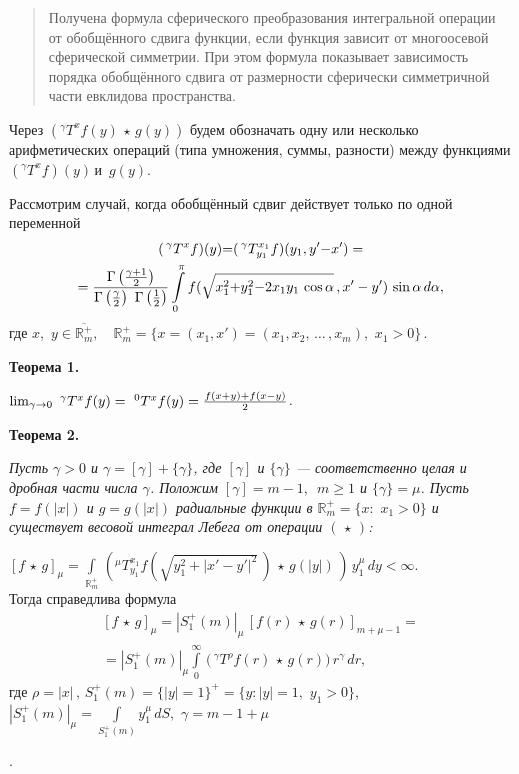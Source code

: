 





\vzmscaption


\begin{quote}
 {\small
Получена формула сферического преобразования интегральной операции от обобщённого сдвига функции, если функция зависит от многоосевой сферической симметрии. При этом формула показывает зависимость порядка обобщённого сдвига от размерности сферически симметричной части евклидова пространства.}
 \end{quote}

	Через
	$
	\left(^\gamma T^xf(y)\,\star\,g(y)\right)
	$
	будем обозначать одну или несколько арифметических операций (типа умножения, суммы, разности) между функциями $\left(^\gamma T^xf\right)(y)$\,и \,$g(y)$.

	 Рассмотрим случай, когда обобщённый сдвиг действует только по одной переменной
\begin{multline*}
	(\,^\gamma T^{x}f)(y){=}(\,^\gamma T_{y_1}^{x_1}f)(y_1,y'{-}x')=
	\\=
	\frac{\Gamma\left(\gamma+1\over2\right)}{\Gamma\left(\frac{\gamma}{2}\right)\,\,\Gamma\left(\frac{1}{2}\right)}\int\limits_0^\pi
	f(\sqrt{x_1^2{+}y^2_1{-}2x_1y_1\,\cos\alpha}\,,x'-y')\,\sin\alpha
	\,d\alpha,
\end{multline*}
где $x,\,\,y\in\overline{\mathbb{R}^+_m},\quad	\mathbb{R}^+_m{=}\{x{=}(x_1,x'){=}(x_1,x_2,\,\ldots\,,x_m),\,\,x_1>0\}\,.$

	{\bf Теорема 1.}  {\it $\lim_{\gamma\to0}\,\,^\gamma T^x f(y)=\,\,^0T^x f(y)={f(x+y)+f(x-y)\over2}$.

{\bf Теорема 2.}  {\it    Пусть $\gamma{>}0$ и $\gamma=[\gamma]+\{\gamma\}$, где $[\gamma]$ и $\{\gamma\}$ --- соответственно целая и дробная части числа $\gamma$.
Положим $[\gamma]=m-1, \,\,\,m\geqslant1$ и $\{\gamma\}=\mu$. Пусть $f=f(|x|)$ и
$g=g(|x|)$ радиальные функции в $\mathbb{R}^+_m=\{x:\,\,x_1>0\}$ и существует весовой интеграл Лебега от операции $(\,\star\,)$:

$
[f\,\star\,g]_\mu=\int\limits_{\mathbb{R}^+_m}\,\left(^\mu T^{x_1}_{y_1}f(\sqrt{y_1^2+
|x'-y'|^2}\,)\,\star\,g(|y|)\,\right)\,y_1^\mu\,dy<\infty.
$ \\
Тогда справедлива формула
\begin{multline}\label{eq2}
	[f\,\star\,g]_\mu=|S_1^+(m)|_\mu\, \left[f(r)\,\star\,g(r)\right]_{m+\mu-1} =
	\\=
	|S^+_1(m)|_\mu\int\limits_0^\infty \,\biggl(\,^\gamma T^\rho f(r)\,\star\,g(r)
	\biggl)\,r^\gamma\,dr,
\end{multline}
где  $\rho=|x|\,, \,S^+_1(m){=}\{|y|{=}1\}^+{=}\{y:|y|{=}1,\,\,y_1>0\}$,
$
|S_1^+(m)|_\mu{=}\int\limits_{S_1^+(m)} y_1^\mu\,dS,$  $\gamma{=}m{-}1{+}\mu$}}.

